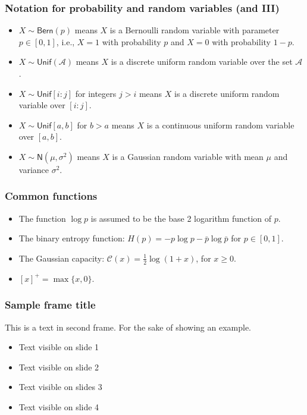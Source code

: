 \documentclass[]{beamer}
\begin{document}
\begin{frame}
\frametitle{Notation for probability and random variables (and III)}
\begin{itemize}
\item $X\sim \mathsf{Bern}(p)$ means $X$ is a Bernoulli random variable with parameter $p\in [0,1]$, i.e., $X=1$ with probability $p$ and $X=0$ with probability $1-p$.
\item $X\sim \mathsf{Unif}(\mathcal A)$ means $X$ is a discrete uniform random variable over the set $\mathcal A$.
\item $X\sim \mathsf{Unif}[i:j]$ for integers $j>i$ means $X$ is a discrete uniform random variable over $[i:j]$.
\item $X\sim \mathsf{Unif}[a,b]$ for $b>a$ means $X$ is a continuous uniform random variable over $[a,b]$.
\item $X\sim \mathsf{N}(\mu, \sigma^2)$ means $X$ is a Gaussian  random variable with mean $\mu$ and variance $\sigma^2$.
\end{itemize}
\end{frame}

\begin{frame}
\frametitle{Common functions}
\begin{itemize}
\item The function $\log p$ is assumed to be the base 2 logarithm function of $p$.
\item The binary entropy function: $H(p)=-p\log p - \bar p \log \bar p$ for $p\in [0,1]$.
\item The Gaussian capacity: $\mathcal C(x)=\frac{1}{2}\log(1+x)$, for $x\geq 0$.
\item $[x]^+=\max\{x,0\}$.
\end{itemize}
\end{frame}

\begin{frame}
\frametitle{Sample frame title}
This is a text in second frame. For the sake of showing an example.

\begin{itemize}
\item<1-> Text visible on slide 1
\item<2-> Text visible on slide 2
\item<3> Text visible on slides 3
\item<4-> Text visible on slide 4
\end{itemize}
\end{frame}
\end{document}
